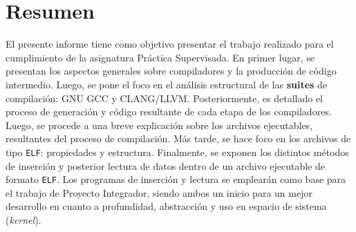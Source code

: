 \hspace{0pt}
\vfill

\section*{\centering Resumen}

El presente informe tiene como objetivo presentar el trabajo realizado para el cumplimiento de la asignatura Práctica Supervisada.
En primer lugar, se presentan los aspectos generales sobre compiladores y la producción de código intermedio. Luego, se pone el foco en el análisis estructural de las \textbf{suites} de compilación: GNU GCC y CLANG/LLVM.
Posteriormente, es detallado el proceso de generación y código resultante de cada etapa de los compiladores.
Luego, se procede a una breve explicación sobre los archivos ejecutables, resultantes del proceso de compilación. Más tarde, se hace foco en los archivos de tipo \texttt{ELF}: propiedades y estructura. 
Finalmente, se exponen los distintos métodos de inserción y posterior lectura de datos dentro de un archivo ejecutable de formato \texttt{ELF}.
\newline
Los programas de inserción y lectura se emplearán como base para el trabajo de Proyecto Integrador, siendo ambos un inicio para un mejor desarrollo en cuanto a profundidad, abstracción y uso en espacio de sistema (\emph{kernel}).

\vfill
\hspace{0pt}






